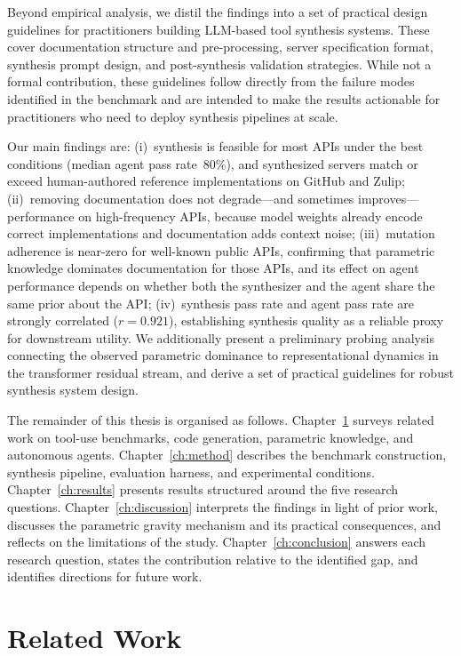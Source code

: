 \documentclass[12pt]{report}
\begin{document}
Beyond empirical analysis, we distil the findings into a set of practical
design guidelines for practitioners building LLM-based tool synthesis systems.
These cover documentation structure and pre-processing, server specification
format, synthesis prompt design, and post-synthesis validation strategies.
While not a formal contribution, these guidelines follow directly from the
failure modes identified in the benchmark and are intended to make the
results actionable for practitioners who need to deploy synthesis pipelines
at scale.

Our main findings are: (i)~synthesis is feasible for most APIs under the
best conditions (median agent pass rate~80\%), and synthesized servers match
or exceed human-authored reference implementations on GitHub and Zulip;
(ii)~removing documentation does not degrade---and sometimes improves---
performance on high-frequency APIs, because model weights already encode
correct implementations and documentation adds context noise;
(iii)~mutation adherence is near-zero for well-known public APIs, confirming
that parametric knowledge dominates documentation for those APIs, and its
effect on agent performance depends on whether both the synthesizer and the
agent share the same prior about the API;
(iv)~synthesis pass rate and agent pass rate are strongly correlated
($r = 0.921$), establishing synthesis quality as a reliable proxy for
downstream utility.
We additionally present a preliminary probing analysis connecting the
observed parametric dominance to representational dynamics in the transformer
residual stream, and derive a set of practical guidelines for robust synthesis
system design.

The remainder of this thesis is organised as follows.
Chapter~\ref{ch:related} surveys related work on tool-use benchmarks,
code generation, parametric knowledge, and autonomous agents.
Chapter~\ref{ch:method} describes the benchmark construction, synthesis
pipeline, evaluation harness, and experimental conditions.
Chapter~\ref{ch:results} presents results structured around the five research
questions.
Chapter~\ref{ch:discussion} interprets the findings in light of prior work,
discusses the parametric gravity mechanism and its practical consequences,
and reflects on the limitations of the study.
Chapter~\ref{ch:conclusion} answers each research question, states the
contribution relative to the identified gap, and identifies directions for
future work.


\chapter{Related Work}
\label{ch:related}
\end{document}
